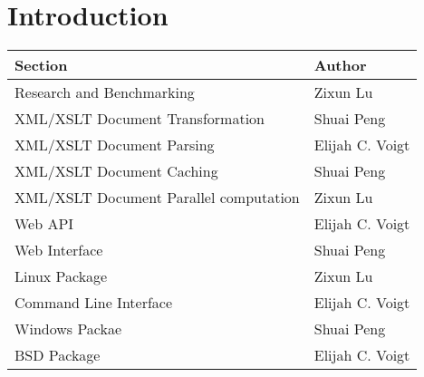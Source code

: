\section{Introduction}

\begin{center}
    \begin{tabular}{ | l | p{10cm} |}
    \hline
    Section & Author \\ \hline
    Research and Benchmarking & Zixun Lu \\ \hline
    XML/XSLT Document Transformation & Shuai Peng \\ \hline
    XML/XSLT Document Parsing & Elijah C. Voigt \\ \hline
    XML/XSLT Document Caching & Shuai Peng \\ \hline
    XML/XSLT Document Parallel computation & Zixun Lu \\ \hline
    Web API & Elijah C. Voigt\\ \hline
    Web Interface & Shuai Peng \\ \hline
    Linux Package & Zixun Lu \\ \hline
    Command Line Interface& Elijah C. Voigt \\ \hline
    Windows Packae & Shuai Peng \\ \hline
    BSD Package & Elijah C. Voigt \\ \hline
    \end{tabular}
\end{center}

\tableofcontents

\clearpage


\newpage

\printbibliography
